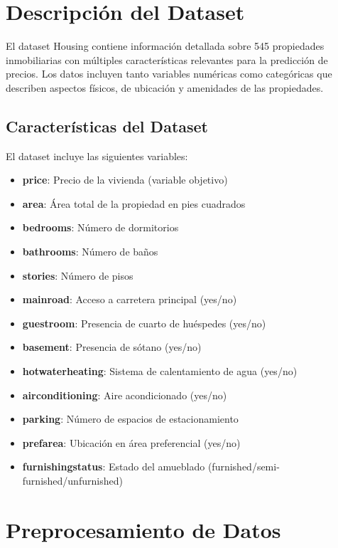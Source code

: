 \documentclass[11pt,a4paper]{article}
\begin{document}
\section{Descripción del Dataset}

El dataset Housing contiene información detallada sobre 545 propiedades inmobiliarias con múltiples características relevantes para la predicción de precios. Los datos incluyen tanto variables numéricas como categóricas que describen aspectos físicos, de ubicación y amenidades de las propiedades.

\subsection{Características del Dataset}

El dataset incluye las siguientes variables:

\begin{itemize}
    \item \textbf{price}: Precio de la vivienda (variable objetivo)
    \item \textbf{area}: Área total de la propiedad en pies cuadrados
    \item \textbf{bedrooms}: Número de dormitorios
    \item \textbf{bathrooms}: Número de baños
    \item \textbf{stories}: Número de pisos
    \item \textbf{mainroad}: Acceso a carretera principal (yes/no)
    \item \textbf{guestroom}: Presencia de cuarto de huéspedes (yes/no)
    \item \textbf{basement}: Presencia de sótano (yes/no)
    \item \textbf{hotwaterheating}: Sistema de calentamiento de agua (yes/no)
    \item \textbf{airconditioning}: Aire acondicionado (yes/no)
    \item \textbf{parking}: Número de espacios de estacionamiento
    \item \textbf{prefarea}: Ubicación en área preferencial (yes/no)
    \item \textbf{furnishingstatus}: Estado del amueblado (furnished/semi-furnished/unfurnished)
\end{itemize}

\section{Preprocesamiento de Datos}
\end{document}
